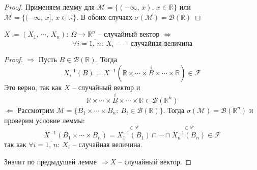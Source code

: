 \begin{proof}
	Применяем лемму для $\mathcal{M} = \{(-\infty,\,x),\, x \in \mathbb{R}\}$ или $\mathcal{M} = \{(-\infty,\,x],\, x \in \mathbb{R}\}$. В обоих случаях $\sigma(\mathcal{M}) = \mathcal{B}(\mathbb{R})$
\end{proof}

\begin{corollary}
	$X := (X_1,\,\cdots,\,X_n):\: \Omega \to \mathbb{R}^n$ -- случайный вектор $\Leftrightarrow$
	\[\forall i = \overline{1,\,n}:\: X_i -- \text{ случайная величина}\]
\end{corollary}

\begin{proof}
	$\Rightarrow$ Пусть $B \in \mathcal{B}(\mathbb{R})$. Тогда
	\[X_i^{-1}(B) = X^{-1}(\mathbb{R} \times\cdots\times \stackrel{i}{B}\times\cdots\times\mathbb{R}) \in \mathcal{F}\]
	Это верно, так как $X$ -- случайный вектор и
	\[\mathbb{R} \times\cdots\times \stackrel{i}{B}\times\cdots\times \mathbb{R} \in \mathcal{B}(\mathbb{R}^n)\]
	$\Leftarrow$ Рассмотрим $\mathcal{M} = \{B_1\times\cdots\times B_n :\: B_i \in \mathcal{B}(\mathbb{R})\}$. Тогда $\sigma(\mathcal{M}) = \mathcal{B}(\mathbb{R}^n)$ и проверим условие леммы:
	\[X^{-1}(B_1\times\cdots\times B_n) = \stackrel{\in \mathcal{F}}{X^{-1}_1(B_1)} \cap\cdots\cap \stackrel{\in \mathcal{F}}{X_n^{-1}(B_n)} \in \mathcal{F}\]
	так как $\forall i = \overline{1,\,n}:\: X_i$ -- случайная величина.

	Значит по предыдущей лемме $\Rightarrow X$ -- случайный вектор.
\end{proof}
